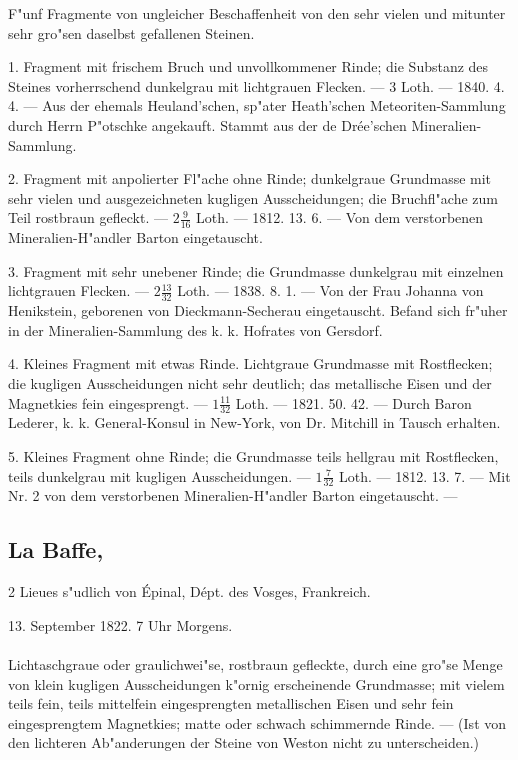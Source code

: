 \documentclass[a4paper, 11pt, oneside, polutonikogreek, german]{article}
\begin{document}
F"unf Fragmente von ungleicher Beschaffenheit von den sehr vielen und mitunter sehr gro"sen daselbst gefallenen Steinen.

1. Fragment mit frischem Bruch und unvollkommener Rinde; die Substanz des Steines vorherrschend dunkelgrau mit lichtgrauen Flecken. --- 3 Loth. --- 1840. 4. 4. --- Aus der ehemals Heuland'schen, sp"ater Heath'schen Meteoriten-Sammlung durch Herrn P"otschke angekauft. Stammt aus der de Drée'schen Mineralien-Sammlung.

2. Fragment mit anpolierter Fl"ache ohne Rinde; dunkelgraue Grundmasse mit sehr vielen und ausgezeichneten kugligen Ausscheidungen; die Bruchfl"ache zum Teil rostbraun gefleckt. --- $2\frac{9}{16}$ Loth. --- 1812. 13. 6. --- Von dem verstorbenen Mineralien-H"andler Barton eingetauscht.

3. Fragment mit sehr unebener Rinde; die Grundmasse dunkelgrau mit einzelnen lichtgrauen Flecken. --- $2\frac{13}{32}$ Loth. --- 1838. 8. 1. --- Von der Frau Johanna von Henikstein, geborenen von Dieckmann-Secherau eingetauscht. Befand sich fr"uher in der Mineralien-Sammlung des k. k. Hofrates von Gersdorf.

4. Kleines Fragment mit etwas Rinde. Lichtgraue Grundmasse mit Rostflecken; die kugligen Ausscheidungen nicht sehr deutlich; das metallische Eisen und der Magnetkies fein eingesprengt. --- $1\frac{11}{32}$ Loth. --- 1821. 50. 42. --- Durch Baron Lederer, k. k. General-Konsul in New-York, von Dr. Mitchill in Tausch erhalten.

5. Kleines Fragment ohne Rinde; die Grundmasse teils hellgrau mit Rostflecken, teils dunkelgrau mit kugligen Ausscheidungen. --- $1\frac{7}{32}$ Loth. --- 1812. 13. 7. --- Mit Nr. 2 von dem verstorbenen Mineralien-H"andler Barton eingetauscht. ---
\subsection[La Baffe.]{La Baffe,}
\begin{center}
\small
2 Lieues s"udlich von Épinal, Dépt. des Vosges, Frankreich.

13. September 1822. 7 Uhr Morgens.
\end{center}
\paragraph{}
Lichtaschgraue oder graulichwei"se, rostbraun gefleckte, durch eine gro"se Menge von klein kugligen Ausscheidungen k"ornig erscheinende Grundmasse; mit vielem teils fein, teils mittelfein eingesprengten metallischen Eisen und sehr fein eingesprengtem Magnetkies; matte oder schwach schimmernde Rinde. --- (Ist von den lichteren Ab"anderungen der Steine von Weston nicht zu unterscheiden.)
\end{document}
